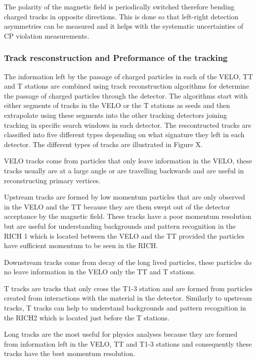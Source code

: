 The polarity of the magnetic field is periodically switched therefore bending charged tracks in opposite directions. This is done so that left-right detection asymmetries can be measured and it helps with the systematic uncertainties of CP violation measurements. %

\subsubsection{Track resconstruction and Preformance of the tracking}


The information left by the passage of charged particles in each of the VELO, TT and T stations are combined using track reconstruction algorithms for determine the passage of charged particles through the detector. The algorithms start with either segments of tracks in the VELO or the T stations as seeds and then extrapolate using these segments into the other tracking detectors joining tracking in specific search windows in each detector. The rescontructed tracks are classified into five different types depending on what signature they left in each detector. The different types of tracks are illustrated in Figure X. 

VELO tracks come from particles that only leave information in the VELO, these tracks usually are at a large angle or are travelling backwards and are useful in reconstructing primary vertices.

Upstream tracks are formed by low momentum particles that are only observed in the VELO and the TT because they are them swept out of the detector acceptance by the magnetic field. These tracks have a poor momentum resolution but are useful for understanding backgrounds and pattern recognition in the RICH 1 which is located between the VELO and the TT provided the particles have sufficient momentum to be seen in the RICH.

Downstream tracks come from decay of the long lived particles, these particles do no leave information in the VELO only the TT and T stations. 

T tracks are tracks that only cross the T1-3 station and are formed from particles created from interactions with the material in the detector. Similarly to upstream tracks, T tracks can help to understand backgrounds and pattern recognition in the RICH2 which is located just before the T stations.

Long tracks are the most useful for physics analyses because they are formed from information left in the VELO, TT and T1-3 stations and consequently these tracks have the best momentum resolution.

